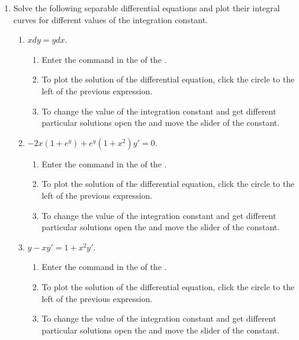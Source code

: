 \begin{enumerate}[leftmargin=*]
\item Solve the following separable differential equations and plot their integral curves for different values of the integration constant.
      \begin{enumerate}
      \item $xdy=ydx$.
            \begin{indication}
            \begin{enumerate}
            \item Enter the command  in the  of the .
            \item To plot the solution of the differential equation, click the circle to the left of the previous expression.
            \item To change the value of the integration constant and get different particular solutions open the  and move the slider of the constant.
            \end{enumerate}
            \end{indication}

      \item $-2x(1+e^y)+e^y(1+x^{2})y'=0$.
            \begin{indication}
            \begin{enumerate}
            \item Enter the command  in the  of the .
            \item To plot the solution of the differential equation, click the circle to the left of the previous expression.
            \item To change the value of the integration constant and get different particular solutions open the  and move the slider of the constant.
            \end{enumerate}
            \end{indication}

      \item $y-xy'=1+x^2y'$.
            \begin{indication}
            \begin{enumerate}
            \item Enter the command  in the  of the .
            \item To plot the solution of the differential equation, click the circle to the left of the previous expression.
            \item To change the value of the integration constant and get different particular solutions open the  and move the slider of the constant.
            \end{enumerate}
            \end{indication}
      \end{enumerate}



\end{enumerate}
